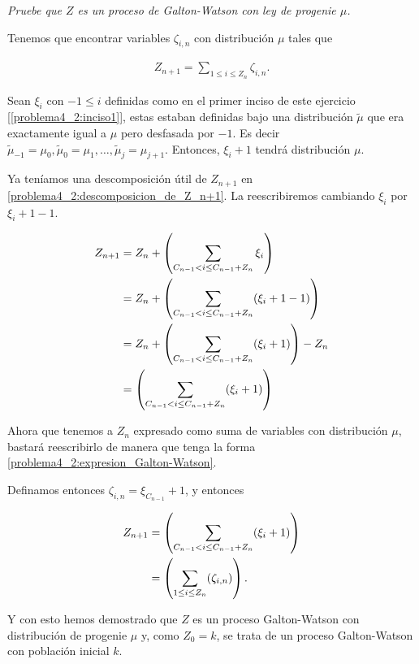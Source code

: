 \emph{
	Pruebe que $Z$ es un proceso de Galton-Watson con ley de progenie $\mu$.
}

\afterstatement\par\null

Tenemos que encontrar variables $\zeta_{i,n}$ con distribución $\mu$ tales que

\begin{align}
    Z_{n+1} =   \sum_{1 \leq i \leq Z_n} \zeta_{i,n}. \label{problema4_2:expresion_Galton-Watson}
\end{align}

Sean $\xi_{i}$ con $-1 \leq i$ definidas como en el primer inciso de este ejercicio [\ref{problema4_2:inciso1}],
estas estaban definidas bajo una distribución $\tilde\mu$ que era exactamente igual a $\mu$ pero desfasada por $-1$.
Es decir $\tilde\mu_{-1} = \mu_{0}, \tilde\mu_{0} = \mu_{1}, \dots, \tilde\mu_{j} = \mu_{j+1}$. Entonces, 
$\xi_{i} + 1$ tendrá distribución $\mu$.\par\null

Ya teníamos una descomposición útil de $Z_{n+1}$ en \eqref{problema4_2:descomposicion_de_Z_n+1}. La reescribiremos cambiando $\xi_{i}$
por $\xi_{i} + 1 - 1$.

\begin{align}
    Z_{n+1} &=  Z_n + \left( \sum_{C_{n-1} < i \leq  C_{n-1} + Z_{n}} \xi_i\right)                 \\
            &=  Z_n + \left( \sum_{C_{n-1} < i \leq  C_{n-1} + Z_{n}} (\xi_i + 1 - 1)\right)       \\
            &=  Z_n + \left( \sum_{C_{n-1} < i \leq  C_{n-1} + Z_{n}} (\xi_i + 1)\right)  - Z_n    \\
            &=  \left( \sum_{C_{n-1} < i \leq  C_{n-1} + Z_{n}} (\xi_i + 1)\right)                 
\end{align}

Ahora que tenemos a $Z_{n}$ expresado como suma de variables con distribución $\mu$, bastará reescribirlo de manera que
tenga la forma \eqref{problema4_2:expresion_Galton-Watson}.\par\null

Definamos entonces $\zeta_{i, n} = \xi_{C_{n-1}} + 1$, y entonces

\begin{align}
    Z_{n+1} &=  \left( \sum_{C_{n-1} < i \leq  C_{n-1} + Z_{n}} (\xi_i + 1)\right)     \\
            &=  \left( \sum_{1 \leq i \leq Z_{n}} (\zeta_{i, n})\right) .
\end{align}

Y con esto hemos demostrado que $Z$ es un proceso Galton-Watson con distribución de progenie $\mu$ y, como $Z_0 = k$, se trata
de un proceso Galton-Watson con población inicial $k$.